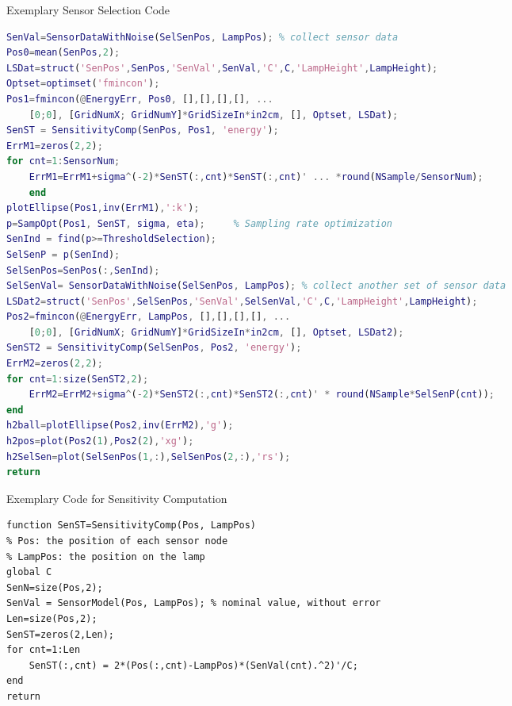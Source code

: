 \begin{table}
\caption{Exemplary Sensor Selection Code}\label{t:egCOSScode}
\begin{lstlisting}[language=Matlab]
SenVal=SensorDataWithNoise(SelSenPos, LampPos); % collect sensor data
Pos0=mean(SenPos,2);
LSDat=struct('SenPos',SenPos,'SenVal',SenVal,'C',C,'LampHeight',LampHeight);
Optset=optimset('fmincon');
Pos1=fmincon(@EnergyErr, Pos0, [],[],[],[], ...
    [0;0], [GridNumX; GridNumY]*GridSizeIn*in2cm, [], Optset, LSDat);
SenST = SensitivityComp(SenPos, Pos1, 'energy');
ErrM1=zeros(2,2);
for cnt=1:SensorNum;
    ErrM1=ErrM1+sigma^(-2)*SenST(:,cnt)*SenST(:,cnt)' ... *round(NSample/SensorNum);
    end
plotEllipse(Pos1,inv(ErrM1),':k');
p=SampOpt(Pos1, SenST, sigma, eta);     % Sampling rate optimization
SenInd = find(p>=ThresholdSelection);
SelSenP = p(SenInd);
SelSenPos=SenPos(:,SenInd);
SelSenVal= SensorDataWithNoise(SelSenPos, LampPos); % collect another set of sensor data
LSDat2=struct('SenPos',SelSenPos,'SenVal',SelSenVal,'C',C,'LampHeight',LampHeight);
Pos2=fmincon(@EnergyErr, LampPos, [],[],[],[], ...
    [0;0], [GridNumX; GridNumY]*GridSizeIn*in2cm, [], Optset, LSDat2);
SenST2 = SensitivityComp(SelSenPos, Pos2, 'energy');
ErrM2=zeros(2,2);
for cnt=1:size(SenST2,2);
    ErrM2=ErrM2+sigma^(-2)*SenST2(:,cnt)*SenST2(:,cnt)' * round(NSample*SelSenP(cnt));
end
h2ball=plotEllipse(Pos2,inv(ErrM2),'g');
h2pos=plot(Pos2(1),Pos2(2),'xg');
h2SelSen=plot(SelSenPos(1,:),SelSenPos(2,:),'rs');
return
\end{lstlisting}
\end{table}


\begin{table}
\caption{Exemplary Code for Sensitivity Computation}\label{t:senst}
\begin{lstlisting}
function SenST=SensitivityComp(Pos, LampPos)
% Pos: the position of each sensor node
% LampPos: the position on the lamp
global C
SenN=size(Pos,2);
SenVal = SensorModel(Pos, LampPos); % nominal value, without error
Len=size(Pos,2);
SenST=zeros(2,Len);
for cnt=1:Len
    SenST(:,cnt) = 2*(Pos(:,cnt)-LampPos)*(SenVal(cnt).^2)'/C;
end
return
\end{lstlisting}
\end{table}




